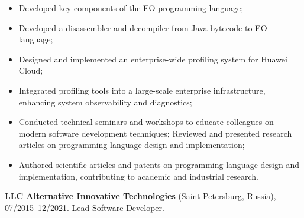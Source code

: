 \documentclass{vl}
\begin{document}
    \begin{itemize}
        \itemsep0em
        \item Developed key components of the \href{https://github.com/objectionary/eo}{EO} programming language;
        \item Developed a disassembler and decompiler from Java bytecode to EO language;
        \item Designed and implemented an enterprise-wide profiling system for Huawei Cloud;
        \item Integrated profiling tools into a large-scale enterprise infrastructure, enhancing system
        observability and diagnostics;
        \item Conducted technical seminars and workshops to educate colleagues on modern software development techniques;
        Reviewed and presented research articles on programming language design and implementation;
        \item Authored scientific articles and patents on programming language design and implementation,
        contributing to academic and industrial research.
    \end{itemize}

%

    \textbf{\href{https://altinntech.com/en/}{LLC Alternative Innovative Technologies}} (Saint Petersburg, Russia),
    07/2015--12/2021.
    Lead Software Developer.
\end{document}
